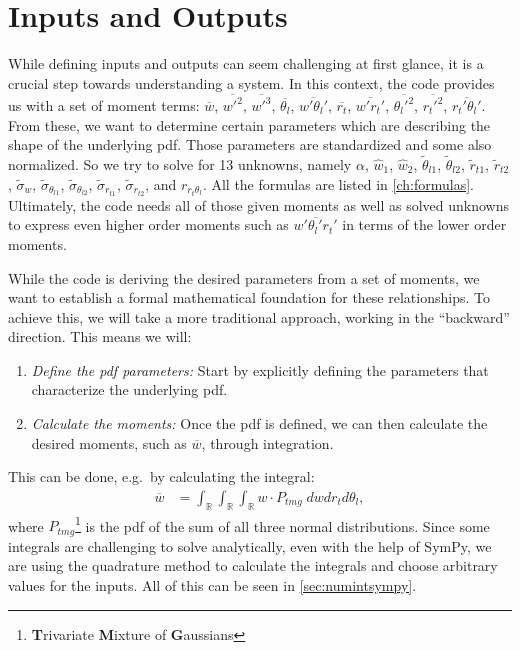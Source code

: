 \section{Inputs and Outputs}\label{sec:inputsandoutputs}

While defining inputs and outputs can seem challenging at first glance,
it is a crucial step towards understanding a system.
In this context,
the code provides us with a set of moment terms:
$\overline{w}$, $\overline{w'^2}$, $\overline{w'^3}$, $\overline{\theta_l}$, $\overline{w'\theta_l'}$,
$\overline{r_t}$, $\overline{w' r_t'}$, $\overline{\theta_l'^2}$, $\overline{r_t'^2}$, $\overline{r_t'\theta_l'}$.
From these, we want to determine certain parameters which are describing the shape of the underlying \gls{pdf}.
Those parameters are standardized and some also normalized.
So we try to solve for 13 unknowns,
namely $\alpha$, $\widehat{w}_1$, $\widehat{w}_2$, $\tilde{\theta}_{l1}$, $\tilde{\theta}_{l2}$, $\tilde{r}_{t1}$,
$\tilde{r}_{t2}$, $\tilde{\sigma}_w$, $\tilde{\sigma}_{\theta_{l1}}$, $\tilde{\sigma}_{\theta_{l2}}$,
$\tilde{\sigma}_{r_{t1}}$, $\tilde{\sigma}_{r_{t2}}$, and $r_{r_t \theta_l}$.
All the formulas are listed in \cref{ch:formulas}.
Ultimately, the code needs all of those given moments as well as solved unknowns
to express even higher order moments such as $\overline{w'\theta_l'r_t'}$
in terms of the lower order moments.

While the code is deriving the desired parameters from a set of moments,
we want to establish a formal mathematical foundation for these relationships.
To achieve this, we will take a more traditional approach, working in the \enquote{backward} direction.
This means we will:
\begin{enumerate}
    \item \emph{Define the \gls{pdf} parameters:}
    Start by explicitly defining the parameters that characterize the underlying \gls{pdf}.
    \item \emph{Calculate the moments:}
    Once the \gls{pdf} is defined, we can then calculate the desired moments,
    such as $\overline{w}$, through integration.
\end{enumerate}
This can be done, e.g.\ by calculating the integral:
\begin{align}
    \overline{w}
    &= \int_{\mathbb{R}} \int_{\mathbb{R}} \int_{\mathbb{R}} w \cdot P_{tmg} \; dw dr_t d\theta_l,
\end{align}
where $P_{tmg}$\footnote{\textbf{T}rivariate \textbf{M}ixture of \textbf{G}aussians} is the \gls{pdf} of the sum of all three normal distributions.
Since some integrals are challenging to solve analytically,
even with the help of SymPy,
we are using the quadrature method to calculate the integrals
and choose arbitrary values for the inputs.
All of this can be seen in \cref{sec:numintsympy}.
